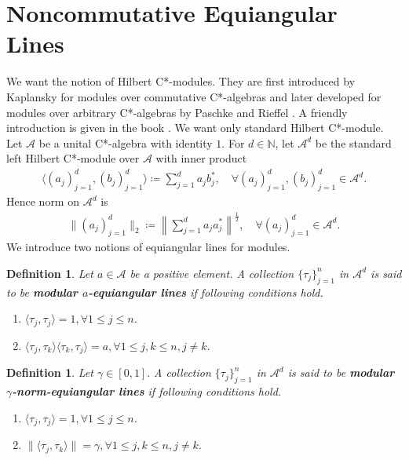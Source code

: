 \documentclass{amsart}
\newtheorem{definition}[theorem]{Definition}
\begin{document}
\section{Noncommutative Equiangular Lines}
We want the notion of Hilbert C*-modules. They are first introduced by Kaplansky \cite{KAPLANSKY} for modules over commutative C*-algebras and later developed for modules over arbitrary C*-algebras by Paschke  \cite{PASCHKE} and Rieffel \cite{RIEFFEL}. A friendly introduction is given in the book \cite{WEGGEOLSEN}. We want only standard Hilbert C*-module. Let $\mathcal{A}$ be a  unital C*-algebra with identity $1$.
 For $d\in \mathbb{N}$, let $\mathcal{A}^d$ be the standard left Hilbert C*-module over $\mathcal{A}$ with inner product 
\begin{align*}
	\langle (a_j)_{j=1}^d, (b_j)_{j=1}^d\rangle \coloneqq \sum_{j=1}^{d}a_jb_j^*, \quad \forall (a_j)_{j=1}^d, (b_j)_{j=1}^d \in \mathcal{A}^d.
\end{align*}
Hence norm on $\mathcal{A}^d$ is 
\begin{align*}
	\|(a_j)_{j=1}^d\|_2\coloneqq \left\|\sum_{j=1}^{d}a_ja_j^*\right\|^\frac{1}{2}, \quad \forall (a_j)_{j=1}^d \in \mathcal{A}^d.
\end{align*}
 We  introduce two notions of equiangular lines for modules.
\begin{definition}\label{A}
Let $a \in \mathcal{A}$ be a positive	element.   A collection $\{\tau_j\}_{j=1}^n$ in  $\mathcal{A}^d$  is said to be \textbf{modular $a$-equiangular  lines} if following conditions hold.
\begin{enumerate}[\upshape(i)]
	\item $	\langle \tau_j, \tau_j \rangle =1,  \forall 1\leq j \leq n$.
	\item $	\langle\tau_j, \tau_k \rangle\langle\tau_k, \tau_j \rangle=a,  \forall 	1\leq j , k \leq n , j\neq k.$
\end{enumerate}
\end{definition}
\begin{definition}
	Let $\gamma\in [0,1].$   A collection $\{\tau_j\}_{j=1}^n$ in  $\mathcal{A}^d$  is said to be \textbf{modular $\gamma$-norm-equiangular  lines} if following conditions hold.
	\begin{enumerate}[\upshape(i)]
		\item $	\langle \tau_j, \tau_j \rangle =1,  \forall 1\leq j \leq n$.
		\item $	\|\langle\tau_j, \tau_k \rangle\|=\gamma,  \forall 	1\leq j , k \leq n , j\neq k.$
	\end{enumerate}
\end{definition}
\end{document}
